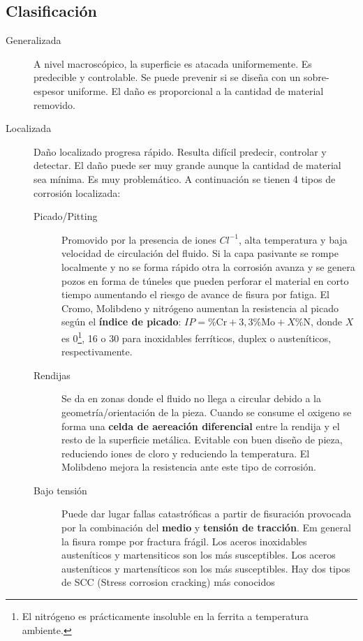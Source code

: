 \subsection{Clasificación}
\begin{description}
	\item[Generalizada] A nivel macroscópico, la superficie es atacada uniformemente. Es predecible y controlable. Se puede prevenir si se diseña con un sobre-espesor uniforme. El daño es proporcional a la cantidad de material removido.
	\item[Localizada] Daño localizado progresa rápido. Resulta difícil predecir, controlar y detectar. El daño puede ser muy grande aunque la cantidad de material sea mínima. Es muy problemático. A continuación se tienen 4 tipos de corrosión localizada:
	      \begin{description}
		      \item[Picado/Pitting] Promovido por la presencia de iones $Cl^{-1}$, alta temperatura y baja velocidad de circulación del fluido. Si la capa pasivante se rompe localmente y no se forma rápido otra la corrosión avanza y se genera pozos en forma de túneles que pueden perforar el material en corto tiempo aumentando el riesgo de avance de fisura por fatiga. El Cromo, Molibdeno y nitrógeno aumentan la resistencia al picado según el \textbf{índice de picado}: $IP=\% \textrm{Cr} + 3,3\% \textrm{Mo} + X \%\textrm{N}$,  donde $X$ es 0\footnote{El nitrógeno es prácticamente insoluble en la ferrita a temperatura ambiente.}, 16 o 30 para inoxidables ferríticos, duplex o austeníticos, respectivamente. 
		      \item[Rendijas] Se da en zonas donde el fluido no llega a circular debido a la geometría/orientación de la pieza. Cuando se consume el oxigeno se forma una \textbf{celda de aereación diferencial} entre la rendija y el resto de la superficie metálica. Evitable con buen diseño de pieza, reduciendo iones de cloro y reduciendo la temperatura. El Molibdeno mejora la resistencia ante este tipo de corrosión.
		      \item[Bajo tensión] Puede dar lugar  fallas catastróficas a partir de fisuración provocada por la combinación del \textbf{medio} y \textbf{tensión de tracción}. Em general la fisura rompe por fractura frágil. Los aceros inoxidables austeníticos y martensiticos son los más susceptibles. Los aceros austeníticos y martensíticos son los más susceptibles. Hay dos tipos de SCC (Stress corrosion cracking) más conocidos
		      \begin{description}

\end{description}
\end{description}
\end{description}
